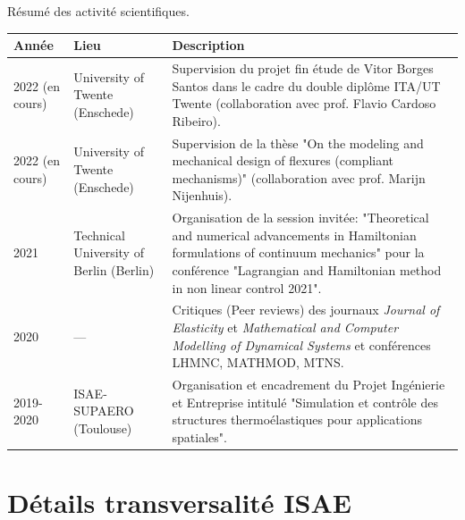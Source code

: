 \documentclass[aspectratio=169, french]{beamer}
\begin{document}
\begin{frame}{Résumé des activité scientifiques.}
	\small
	\begin{table}
		\centering
		\begin{tabular}{p{}p{}p{}}
			\hline
			Année & Lieu & Description  \\
			\hline
			2022 (en cours) & University of Twente (Enschede) & Supervision du projet fin étude de Vitor Borges Santos dans le cadre du double diplôme ITA/UT Twente (collaboration avec prof. Flavio Cardoso Ribeiro). \\
			2022 (en cours) & University of Twente (Enschede) & Supervision de la thèse "On the modeling and mechanical design of flexures (compliant mechanisms)" (collaboration avec prof. Marijn Nijenhuis). \\
			\hline
			2021  & Technical University of Berlin (Berlin) & Organisation de la session invitée: "Theoretical and numerical advancements in Hamiltonian formulations of continuum mechanics" pour la conférence "Lagrangian and Hamiltonian method in non linear control 2021". \\
			\hline
			2020 & --- & Critiques (Peer reviews) des journaux \textit{Journal of Elasticity} et \textit{Mathematical and Computer Modelling of Dynamical Systems} et conférences LHMNC, MATHMOD, MTNS. \\
			\hline
			2019-2020 & ISAE-SUPAERO (Toulouse) & Organisation et encadrement du Projet Ingénierie et Entreprise intitulé "Simulation et contrôle des structures thermoélastiques pour
			applications spatiales". \\
			\hline
		\end{tabular}

		\label{tab:activites}
	\end{table}
\end{frame}


\section{Détails transversalité ISAE}
\end{document}
